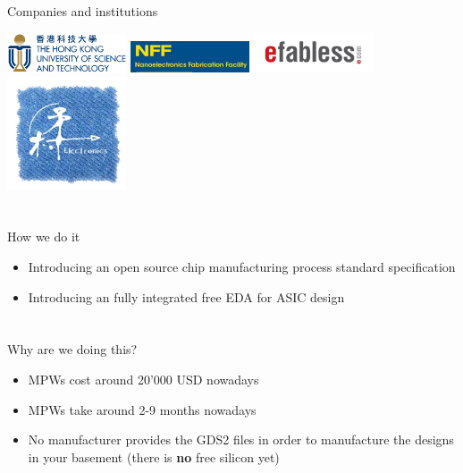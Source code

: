 \documentclass[9pt]{beamer}
\begin{document}
\begin{frame}{Companies and institutions}
	\begin{center}
		\includegraphics[width=100pt]{HKUST_Logo.png}
		\includegraphics[width=100pt]{NFF.jpg}
		\includegraphics[width=100pt]{efabless_logo.png} \\
		\includegraphics[width=100pt]{Lanceville.png}
	\end{center}
\end{frame}

\section[How]{}
\begin{frame}{How we do it}
	\begin{itemize}
		\item Introducing an open source chip manufacturing process standard specification
		\item Introducing an fully integrated free EDA for ASIC design\footnotemark
	\end{itemize}

\end{frame}

\section[Why]{}
\begin{frame}{Why are we doing this?}
	\begin{itemize}
		\item MPWs cost around 20'000 USD nowadays
		\item MPWs take around 2-9 months nowadays
		\item No manufacturer provides the GDS2 files in order to manufacture the designs in your basement (there is \textbf{no} free silicon yet)
	\end{itemize}
\end{frame}
\end{document}

